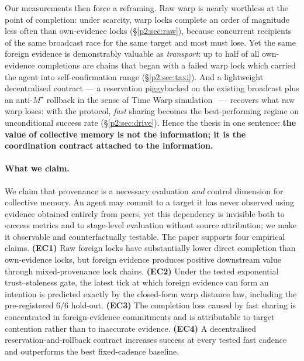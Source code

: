 \documentclass{article}
\newcommand{\mstar}{M^{\star}}
\begin{document}
Our measurements then force a reframing. Raw warp is nearly worthless
at the point of completion: under scarcity, warp locks complete an
order of magnitude less often than own-evidence locks
(\S\ref{p2:sec:raw}), because concurrent recipients of the same broadcast
race for the same target and most must lose. Yet the same foreign
evidence is demonstrably valuable as \emph{transport}: up to half of
all own-evidence completions are chains that began with a failed warp
lock which carried the agent into self-confirmation range
(\S\ref{p2:sec:taxi}). And a lightweight decentralised contract --- a
reservation piggybacked on the existing broadcast plus an
anti-$\mstar$ rollback in the sense of Time Warp
simulation~\cite{jefferson1985}
--- recovers what raw warp loses: with the protocol, \emph{fast}
sharing becomes the best-performing regime on unconditional success
rate (\S\ref{p2:sec:drive}). Hence the thesis in one sentence:
\textbf{the value of collective memory is not the information; it is
the coordination contract attached to the information.}

\paragraph{What we claim.} We claim that provenance is a necessary
evaluation \emph{and} control dimension for collective memory. An
agent may commit to a target it has never observed using evidence
obtained entirely from peers, yet this dependency is invisible both
to success metrics and to stage-level evaluation without source
attribution; we make it observable and counterfactually testable.
The paper supports four empirical claims. \textbf{(EC1)} Raw foreign
locks have substantially lower direct completion than own-evidence
locks, but foreign evidence produces positive downstream value
through mixed-provenance lock chains. \textbf{(EC2)} Under the tested
exponential trust--staleness gate, the latest tick at which foreign
evidence can form an intention is predicted exactly by the
closed-form warp distance law, including the pre-registered $6/6$
hold-out. \textbf{(EC3)} The completion loss caused by fast sharing
is concentrated in foreign-evidence commitments and is attributable
to target contention rather than to inaccurate evidence.
\textbf{(EC4)} A decentralised reservation-and-rollback contract
increases success at every tested fast cadence and outperforms the
best fixed-cadence baseline.
\end{document}
